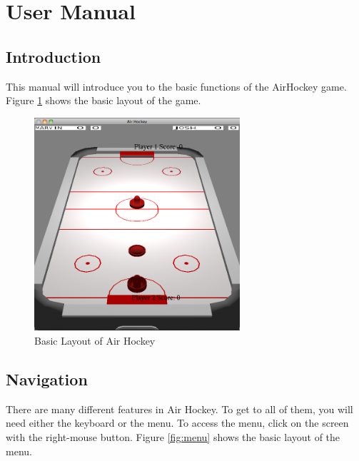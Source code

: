 \documentclass[10pt]{report}
\begin{document}
\clearpage
\section*{User Manual}
\subsection*{Introduction}
This manual will introduce you to the basic functions of the AirHockey 
game. Figure \ref{fig:game} shows the basic layout of the game.

\begin{figure}[!h]
\centering
\includegraphics[width=3in]{game.png}
\caption{Basic Layout of Air Hockey}
\label{fig:game}
\end{figure}

\subsection*{Navigation}
There are many different features in Air Hockey. To get to all of them, you will
need either the keyboard or the menu. To access the menu, click on the screen with
the right-mouse button. Figure \ref{fig:menu} shows the basic layout of the menu. 
\end{document}
